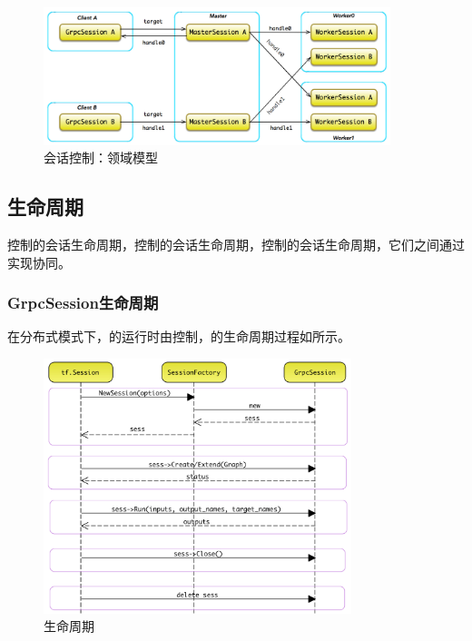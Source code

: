 \begin{content}
\begin{figure}[H]
\centering
\includegraphics[width=0.9\textwidth]{figures/dist-multi-client-conn.png}
\caption{会话控制：领域模型}
 \label{fig:dist-multi-client-conn}
\end{figure}

\subsection{生命周期}

控制的会话生命周期，控制的会话生命周期，控制的会话生命周期，它们之间通过实现协同。

\subsubsection{GrpcSession生命周期}

在分布式模式下，的运行时由控制，的生命周期过程如所示。

\begin{figure}[H]
\centering
\includegraphics[width=0.8\textwidth]{figures/dist-grpc-session-life-cycle.png}
\caption{生命周期}
 \label{fig:dist-grpc-session-life-cycle}
\end{figure}


\end{content}

